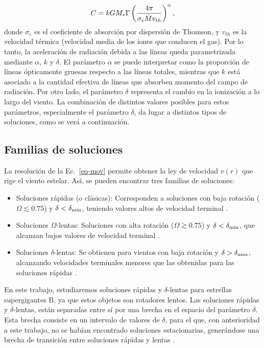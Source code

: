 \documentclass[baaa]{baaa}
\begin{document}
\begin{equation}
  C = k G M_* \Gamma \left(\frac{4 \pi}{\sigma_e \dot{M} v_{th}} \right)^{\alpha}\textnormal{,}
\end{equation}
donde $\sigma_e$ es el coeficiente de absorci\'on por dispersi\'on de Thomson, y $v_{th}$ es la velocidad t\'ermica (velocidad media de los iones que conducen el gas). Por lo tanto, la aceleraci\'on de radiaci\'on debida a las l\'ineas queda parametrizada mediante $\alpha$, $k$ y $\delta$. El par\'ametro $\alpha$ se puede interpretar como la proporci\'on de l\'ineas \'opticamente gruesas respecto a las l\'ineas totales, mientras que $k$ est\'a asociado a la cantidad efectiva de l\'ineas que absorben momento del campo de radiaci\'on. Por otro lado, el par\'ametro $\delta$ representa el cambio en la ionizaci\'on a lo largo del viento. La combinaci\'on de distintos valores posibles para estos par\'ametros, especialmente el par\'ametro $\delta$, da lugar a distintos tipos de soluciones, como se ver\'a a continuaci\'on.


\subsection{Familias de soluciones}
La resoluci\'on de la Ec.~\ref{eq-mov} permite obtener la ley de velocidad $v(r)$ que rige el viento estelar. As\'i, se pueden encontrar tres familias de soluciones:
\begin{itemize}
\item Soluciones r\'apidas (o cl\'asicas): Corresponden a soluciones con baja rotaci\'on ($\Omega \lesssim 0.75$) y $\delta < \delta_{\textnormal{min}}$, teniendo valores altos de velocidad terminal \citep{Pauldrach1986,friendabbott1986}.
\item Soluciones $\Omega$-lentas: Soluciones con alta rotaci\'on ($\Omega \gtrsim 0.75$) y $\delta < \delta_{\textnormal{min}}$, que alcanzan bajos valores de velocidad terminal \citep{cure2004,venero2016}.
\item Soluciones $\delta$-lentas: Se obtienen para vientos con baja rotación y $\delta > \delta_{\textnormal{max}}$, alcanzando velocidades terminales menores que las obtenidas para las soluciones rápidas \citep{cure2011}.

\end{itemize}
En este trabajo, estudiaremos soluciones r\'apidas y $\delta$-lentas para estrellas supergigantes B, ya que estos objetos son rotadores lentos. Las soluciones r\'apidas y $\delta$-lentas, est\'an separadas entre s\'i por una brecha en el espacio del par\'ametro $\delta$. Esta brecha consiste en un intervalo de valores de $\delta$, para el que, con anterioridad a este trabajo, no se hab\'ian encontrado soluciones estacionarias, generándose una brecha de transición entre soluciones rápidas y lentas \citep{venero2016}.
\end{document}
